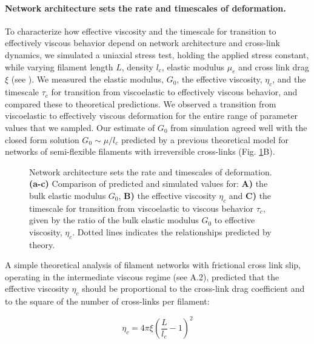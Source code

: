 \documentclass[10pt,letterpaper]{article}
\begin{document}
\paragraph{Network architecture sets the rate and timescales of deformation.}  To characterize how effective viscosity and the timescale for transition to effectively viscous behavior depend on network architecture and cross-link dynamics, we simulated a uniaxial stress test, holding the applied stress constant, while varying filament length $L$, density $l_c$,  elastic modulus $\mu_e$ and cross link drag $\xi$ (see ). We measured the elastic modulus, $G_0$, the effective viscosity, $\eta_c$, and the timescale $\tau_c$ for transition from viscoelastic to effectively viscous behavior, and compared these to theoretical predictions. We observed a transition from viscoelastic to effectively viscous deformation for the entire range of parameter values that we sampled.  Our estimate of $G_0$ from simulation agreed well with the closed form solution  $G_0 \sim \mu/l_c$ predicted by a previous theoretical model \cite{theo_hlm} for networks of semi-flexible filaments with irreversible cross-links (Fig. \ref{fig:passive_form}B). 

\begin{figure}[h!]
	\centering
	\caption{\label{fig:passive_form} Network architecture sets the rate and timescales of deformation.  \textbf{(a-c)} Comparison of predicted and simulated values for: \textbf{A)} the bulk elastic modulus $G_0$,  \textbf{B)} the effective viscosity $\eta_c$ and \textbf{C)} the timescale for transition from viscoelastic to viscous behavior $\tau_c$, given by the ratio of the bulk elastic modulus $G_0$ to effective viscosity, $\eta_c$. Dotted lines indicates the relationships predicted by theory. }
\end{figure}

A simple theoretical analysis of filament networks with frictional cross link slip, operating in the intermediate viscous regime (see  A.2), predicted that the effective viscosity $\eta_c$ should be proportional to the cross-link drag coefficient and to the square of the number of cross-links per filament:

\begin{equation}
\eta_c = 4\pi\xi\left ( \frac{L}{l_c}-1\right )^2
\end{equation}
\end{document}
